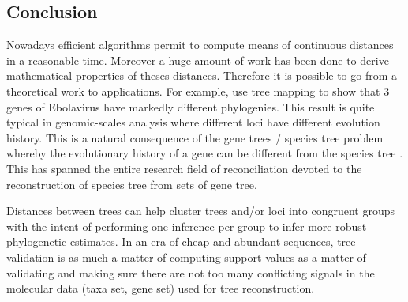 %

\subsection{Conclusion}

Nowadays efficient algorithms permit to compute means of continuous distances in a reasonable time. Moreover a huge amount of work has been done to derive mathematical properties of theses distances. Therefore it is possible to go from a theoretical work to applications. For example, \citet{Kendall2016} use tree mapping to show that 3 genes of Ebolavirus have markedly different phylogenies. This result is quite typical in genomic-scales analysis where different loci have different evolution history. This is a natural consequence of the gene trees / species tree problem whereby the evolutionary history of a gene can be different from the species tree \citep{Degnan2009}. This has spanned the entire research field of reconciliation devoted to the reconstruction of species tree from sets of gene tree. 

Distances between trees can help cluster trees and/or loci into congruent groups with the intent of performing one inference per group to infer more robust phylogenetic estimates. In an era of cheap and abundant sequences, tree validation is as much a matter of computing support values as a matter of validating and making sure there are not too many conflicting signals in the molecular data (taxa set, gene set) used for tree reconstruction. 